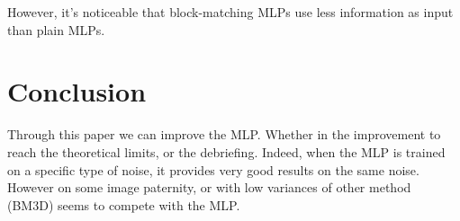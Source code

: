 \documentclass[10pt,a4paper]{article}
\begin{document}
However, it's noticeable that block-matching MLPs use less information as input than plain MLPs.

\section{Conclusion}

Through this paper we can improve the MLP. Whether in the improvement to reach the theoretical limits, or the debriefing. Indeed, when the MLP is trained on a specific type of noise, it provides very good results on the same noise. However on some image paternity, or with low variances of other method (BM3D) seems to compete with the MLP.

\printbibliography
\end{document}
